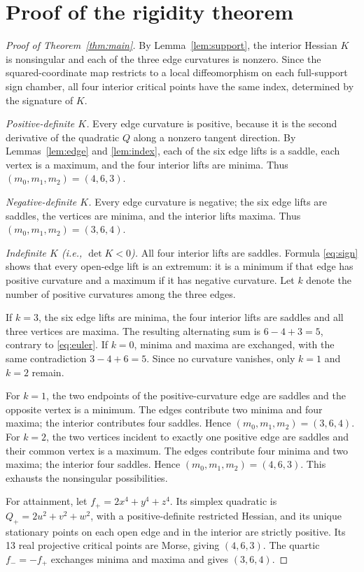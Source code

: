 \documentclass[10pt,a4paper]{article}
\theoremstyle{plain}
\theoremstyle{remark}
\begin{document}
\section{Proof of the rigidity theorem}
\begin{proof}[Proof of Theorem~\ref{thm:main}]
By Lemma~\ref{lem:support}, the interior Hessian $K$ is nonsingular and each of the three edge curvatures is nonzero. Since the squared-coordinate map restricts to a local diffeomorphism on each full-support sign chamber, all four interior critical points have the same index, determined by the signature of $K$.

\emph{Positive-definite $K$.} Every edge curvature is positive, because it is the second derivative of the quadratic $Q$ along a nonzero tangent direction. By Lemmas~\ref{lem:edge} and \ref{lem:index}, each of the six edge lifts is a saddle, each vertex is a maximum, and the four interior lifts are minima. Thus $(m_0,m_1,m_2)=(4,6,3)$.

\emph{Negative-definite $K$.} Every edge curvature is negative; the six edge lifts are saddles, the vertices are minima, and the interior lifts maxima. Thus $(m_0,m_1,m_2)=(3,6,4)$.

\emph{Indefinite $K$ (i.e., $\det K<0$).} All four interior lifts are saddles. Formula \eqref{eq:sign} shows that every open-edge lift is an extremum: it is a minimum if that edge has positive curvature and a maximum if it has negative curvature. Let $k$ denote the number of positive curvatures among the three edges.

If $k=3$, the six edge lifts are minima, the four interior lifts are saddles and all three vertices are maxima. The resulting alternating sum is $6-4+3=5$, contrary to \eqref{eq:euler}. If $k=0$, minima and maxima are exchanged, with the same contradiction $3-4+6=5$. Since no curvature vanishes, only $k=1$ and $k=2$ remain.

For $k=1$, the two endpoints of the positive-curvature edge are saddles and the opposite vertex is a minimum. The edges contribute two minima and four maxima; the interior contributes four saddles. Hence $(m_0,m_1,m_2)=(3,6,4)$. For $k=2$, the two vertices incident to exactly one positive edge are saddles and their common vertex is a maximum. The edges contribute four minima and two maxima; the interior four saddles. Hence $(m_0,m_1,m_2)=(4,6,3)$. This exhausts the nonsingular possibilities.

For attainment, let $f_+=2x^4+y^4+z^4$. Its simplex quadratic is $Q_+=2u^2+v^2+w^2$, with a positive-definite restricted Hessian, and its unique stationary points on each open edge and in the interior are strictly positive. Its 13 real projective critical points are Morse, giving $(4,6,3)$. The quartic $f_-=-f_+$ exchanges minima and maxima and gives $(3,6,4)$.
\end{proof}
\end{document}
